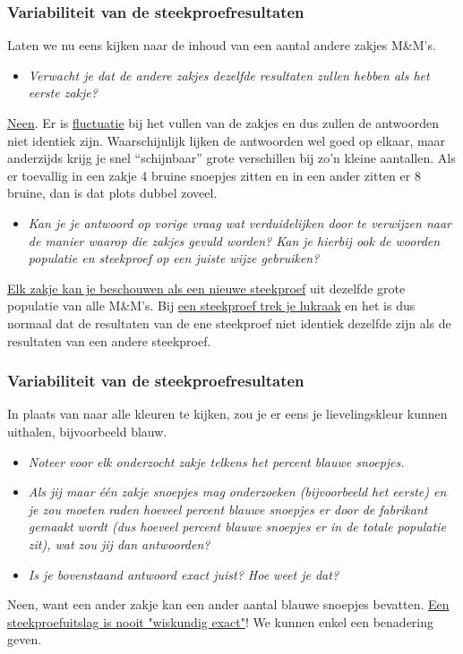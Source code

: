 \documentclass[dutch]{beamer}
\newcommand{\vraag}[1]{\begin{itemize}\item[Vraag:] {\it #1}\end{itemize}}
\begin{document}
\begin{frame}
\frametitle{Variabiliteit van de steekproefresultaten}
Laten we nu eens kijken naar de inhoud van een aantal andere zakjes M\&M's.\\
\pause
\vraag{Verwacht je dat de andere zakjes dezelfde resultaten zullen hebben als het eerste zakje?}
\pause
\uline{Neen}. Er is \uline{fluctuatie} bij het vullen van de zakjes en dus zullen de antwoorden niet identiek
zijn. Waarschijnlijk lijken de antwoorden wel goed op elkaar, maar anderzijds krijg je snel
“schijnbaar” grote verschillen bij zo’n kleine aantallen. Als er toevallig in een zakje 4
bruine snoepjes zitten en in een ander zitten er 8 bruine, dan is dat plots dubbel zoveel.
\pause
\vraag{Kan je je antwoord op vorige vraag wat verduidelijken door te verwijzen naar de manier
waarop die zakjes gevuld worden? Kan je hierbij ook de woorden populatie en steekproef op
een juiste wijze gebruiken?}
\pause
\uline{Elk zakje kan je beschouwen als een nieuwe steekproef} uit dezelfde grote populatie van alle
M\&M’s. Bij \uline{een steekproef trek je lukraak} en het is dus normaal dat de resultaten van de ene
steekproef niet identiek dezelfde zijn als de resultaten van een andere steekproef.
\end{frame}

\begin{frame}
\frametitle{Variabiliteit van de steekproefresultaten}
In plaats van naar alle kleuren te kijken, zou je er eens je lievelingskleur kunnen uithalen,
bijvoorbeeld blauw.\\
\pause
\vraag{Noteer voor elk onderzocht zakje telkens het percent blauwe snoepjes.}
\vspace*{1cm}
\pause
\vraag{Als jij maar één zakje snoepjes mag onderzoeken (bijvoorbeeld het eerste) en je zou moeten raden hoeveel
percent blauwe snoepjes er door de fabrikant gemaakt wordt (dus hoeveel percent blauwe
snoepjes er in de totale populatie zit), wat zou jij dan antwoorden?}
\vspace*{1cm}
\pause
\vraag{Is je bovenstaand antwoord exact juist? Hoe weet je dat?}
\pause
Neen, want een ander zakje kan een ander aantal blauwe snoepjes bevatten. \uline{Een steekproefuitslag is nooit "wiskundig exact"}! We kunnen enkel een benadering geven.
\end{frame}
\end{document}
